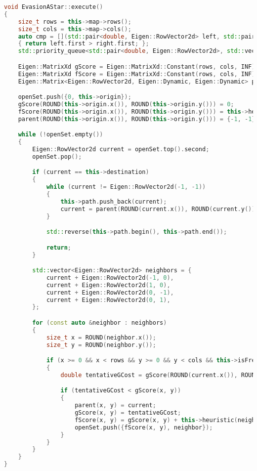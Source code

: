 \begin{lstlisting}[caption={Pathfinding mit A*},label={lst:astar-pathfinding},language={C++}]
void EvasionAStar::execute()
{
    size_t rows = this->map->rows();
    size_t cols = this->map->cols();
    auto cmp = [](std::pair<double, Eigen::RowVector2d> left, std::pair<double, Eigen::RowVector2d> right)
    { return left.first > right.first; };
    std::priority_queue<std::pair<double, Eigen::RowVector2d>, std::vector<std::pair<double, Eigen::RowVector2d>>, decltype(cmp)> openSet(cmp);

    Eigen::MatrixXd gScore = Eigen::MatrixXd::Constant(rows, cols, INF);
    Eigen::MatrixXd fScore = Eigen::MatrixXd::Constant(rows, cols, INF);
    Eigen::Matrix<Eigen::RowVector2d, Eigen::Dynamic, Eigen::Dynamic> parent(rows, cols);

    openSet.push({0, this->origin});
    gScore(ROUND(this->origin.x()), ROUND(this->origin.y())) = 0;
    fScore(ROUND(this->origin.x()), ROUND(this->origin.y())) = this->heuristic(this->origin, this->destination);
    parent(ROUND(this->origin.x()), ROUND(this->origin.y())) = {-1, -1};

    while (!openSet.empty())
    {
        Eigen::RowVector2d current = openSet.top().second;
        openSet.pop();

        if (current == this->destination)
        {
            while (current != Eigen::RowVector2d(-1, -1))
            {
                this->path.push_back(current);
                current = parent(ROUND(current.x()), ROUND(current.y()));
            }

            std::reverse(this->path.begin(), this->path.end());

            return;
        }

        std::vector<Eigen::RowVector2d> neighbors = {
            current + Eigen::RowVector2d(-1, 0),
            current + Eigen::RowVector2d(1, 0),
            current + Eigen::RowVector2d(0, -1),
            current + Eigen::RowVector2d(0, 1),
        };

        for (const auto &neighbor : neighbors)
        {
            size_t x = ROUND(neighbor.x());
            size_t y = ROUND(neighbor.y());

            if (x >= 0 && x < rows && y >= 0 && y < cols && this->isFree(x, y))
            {
                double tentativeGCost = gScore(ROUND(current.x()), ROUND(current.y())) + 1;

                if (tentativeGCost < gScore(x, y))
                {
                    parent(x, y) = current;
                    gScore(x, y) = tentativeGCost;
                    fScore(x, y) = gScore(x, y) + this->heuristic(neighbor, this->destination);
                    openSet.push({fScore(x, y), neighbor});
                }
            }
        }
    }
}
\end{lstlisting}

